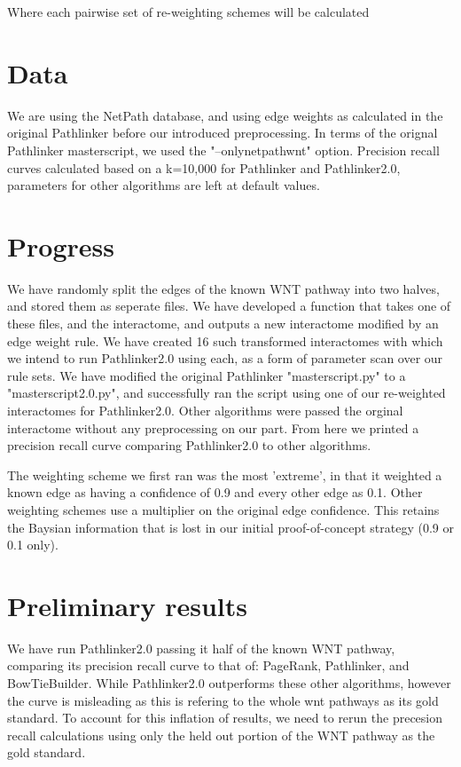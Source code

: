 \documentclass[10pt,letterpaper,twocolumn,twoside]{article}
\begin{document}
Where each pairwise set of re-weighting schemes will be calculated

\section{Data}

We are using the NetPath database, and using edge weights as
calculated in the original Pathlinker before our introduced
preprocessing.  In terms of the orignal Pathlinker masterscript, we
used the "--onlynetpathwnt" option.  Precision recall curves
calculated based on a k=10,000 for Pathlinker and Pathlinker2.0,
parameters for other algorithms are left at default values.

\section{Progress}

We have randomly split the edges of the known WNT pathway into two
halves, and stored them as seperate files.  We have developed a
function that takes one of these files, and the interactome, and
outputs a new interactome modified by an edge weight rule.  We have
created 16 such transformed interactomes with which we intend to run
Pathlinker2.0 using each, as a form of parameter scan over our rule
sets.  We have modified the original Pathlinker "masterscript.py" to a
"masterscript2.0.py", and successfully ran the script using one of our
re-weighted interactomes for Pathlinker2.0.  Other algorithms were
passed the orginal interactome without any preprocessing on our part.
From here we printed a precision recall curve comparing Pathlinker2.0
to other algorithms.

The weighting scheme we first ran was the most 'extreme', in that it
weighted a known edge as having a confidence of 0.9 and every other
edge as 0.1.  Other weighting schemes use a multiplier on the original
edge confidence. This retains the Baysian information that is lost in
our initial proof-of-concept strategy (0.9 or 0.1 only).

\vfill
\pagebreak

\section{Preliminary results}

We have run Pathlinker2.0 passing it half of the known WNT pathway,
comparing its precision recall curve to that of: PageRank, Pathlinker,
and BowTieBuilder.  While Pathlinker2.0 outperforms these other
algorithms, however the curve is misleading as this is refering to the
whole wnt pathways as its gold standard.  To account for this
inflation of results, we need to rerun the precesion recall
calculations using only the held out portion of the WNT pathway as the
gold standard.
\end{document}
